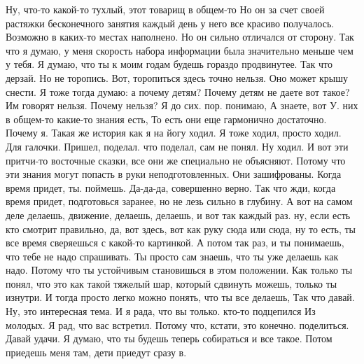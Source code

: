 Ну, что-то какой-то тухлый, этот товарищ в общем-то
Но он за счет своей растяжки бесконечного занятия каждый день у него все красиво получалось.
Возможно в каких-то местах наполнено.
Но он сильно отличался от сторону.
Так что я думаю, у меня скорость набора информации была значительно меньше чем у тебя.
Я думаю, что ты к моим годам будешь гораздо продвинутее.
Так что дерзай.
Но не торопись.
Вот, торопиться здесь точно нельзя.
Оно может крышу снести.
Я тоже тогда думаю: а почему детям?
Почему детям не даете вот такое?
Им говорят нельзя.
Почему нельзя?
Я до сих. пор.
понимаю, А знаете, вот У.
них в общем-то какие-то знания есть, То есть они еще гармонично достаточно.
Почему я.
Такая же история как я на йогу ходил.
Я тоже ходил, просто ходил.
Для галочки.
Пришел, поделал. что поделал, сам не понял.
Ну ходил.
И вот эти притчи-то восточные сказки, все они же специально не объясняют.
Потому что эти знания могут попасть в руки неподготовленных.
Они зашифрованы.
Когда время придет, ты.
поймешь.
Да-да-да, совершенно верно.
Так что жди, когда время придет, подготовься заранее, но не лезь сильно в глубину.
А вот на самом деле делаешь, движение, делаешь, делаешь, и вот так каждый раз. ну, если есть кто смотрит правильно, да, вот здесь, вот как руку сюда или сюда, ну то есть, ты все время сверяешься с какой-то картинкой.
А потом так раз, и ты понимаешь, что тебе не надо спрашивать.
Ты просто сам знаешь, что ты уже делаешь как надо.
Потому что ты устойчивым становишься в этом положении.
Как только ты понял, что это как такой тяжелый шар, который сдвинуть можешь, только ты изнутри.
И тогда просто легко можно понять, что ты все делаешь, Так что давай.
Ну, это интересная тема.
И я рада, что вы только.
кто-то подцепился Из молодых. Я рад, что вас встретил.
Потому что, кстати, это конечно.
поделиться. Давай удачи. Я думаю, что ты будешь теперь собираться и все такое. Потом приедешь меня там, дети приедут сразу в.
\bye

